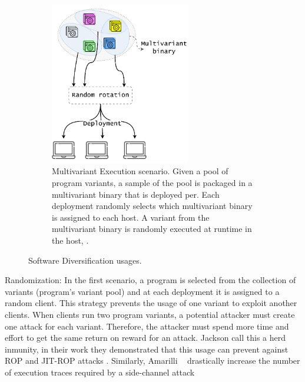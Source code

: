 \begin{figure}[h]
\begin{subfigure}[t]{0.45\textwidth}
    \end{subfigure}
    \hspace{1.5mm}
    \hspace{1.5mm}
    \begin{subfigure}[t]{0.45\textwidth}
        \centering
        \includegraphics[height=2.8in]{diagrams/mve.pdf}
        \caption{Multivariant Execution scenario. Given a pool of program variants, a sample of the pool is packaged in a multivariant binary that is deployed per. Each deployment randomly selects which multivariant binary is assigned to each host. A variant from the multivariant binary is randomly executed at runtime in the host, .}        \label{diagrams:sota:mve}

    \end{subfigure}
    \caption{Software Diversification usages. }
\end{figure}



\begin{usage}{Randomization:}
    \label{usage:randomization}
    \normalfont
    In the first scenario, a program is selected from the collection of variants (program's variant pool) and at each deployment it is assigned to a random client. This strategy prevents the usage of one variant to exploit another clients. When clients run two program variants, a potential attacker must create one attack for each variant. Therefore, the attacker must spend more time and effort to get the same return on reward for an attack. Jackson \etal \cite{jackson} call this a herd inmunity, in their work they demonstrated that this usage can prevent against ROP and JIT-ROP attacks \citationneeded. Similarly, Amarilli \etal~\cite{amarilli2011can} drastically increase the number of execution traces required by a side-channel attack

    
    
\end{usage}

